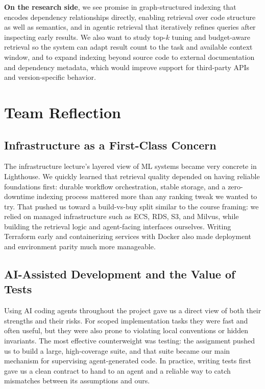 \documentclass[a4paper,12pt]{article}
\begin{document}
\textbf{On the research side}, we see promise in graph-structured indexing that encodes
dependency relationships directly, enabling retrieval over code structure as
well as semantics, and in agentic retrieval that iteratively refines queries
after inspecting early results. We also want to study top-$k$ tuning and
budget-aware retrieval so the system can adapt result count to the task and
available context window, and to expand indexing beyond source code to external
documentation and dependency metadata, which would improve support for
third-party APIs and version-specific behavior.


\section{Team Reflection}
\label{sec:reflection}
\subsection{Infrastructure as a First-Class Concern}

The infrastructure lecture's layered view of ML systems became very concrete in Lighthouse. We quickly learned that retrieval quality depended on having reliable foundations first: durable workflow orchestration, stable storage, and a zero-downtime indexing process mattered more than any ranking tweak we wanted to try. That pushed us toward a build-vs-buy split similar to the course framing: we relied on managed infrastructure such as ECS, RDS, S3, and Milvus, while building the retrieval logic and agent-facing interfaces ourselves. Writing Terraform early and containerizing services with Docker also made deployment and environment parity much more manageable.\\

\subsection{AI-Assisted Development and the Value of Tests}

Using AI coding agents throughout the project gave us a direct view of both their strengths and their risks. For scoped implementation tasks they were fast and often useful, but they were also prone to violating local conventions or hidden invariants. The most effective counterweight was testing: the assignment pushed us to build a large, high-coverage suite, and that suite became our main mechanism for supervising agent-generated code. In practice, writing tests first gave us a clean contract to hand to an agent and a reliable way to catch mismatches between its assumptions and ours.\\
\end{document}
